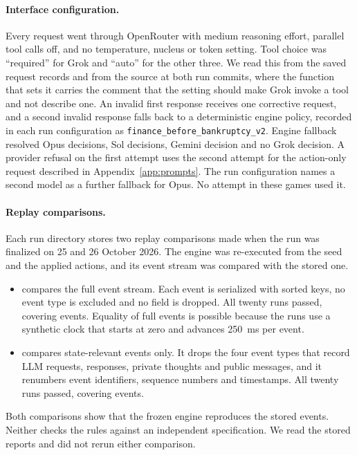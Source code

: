 \paragraph{Interface configuration.}
Every request went through OpenRouter with medium reasoning effort, parallel tool calls off, and no temperature, nucleus or token setting. Tool choice was ``required'' for Grok and ``auto'' for the other three. We read this from the  saved request records and from the source at both run commits, where the function that sets it carries the comment that the setting should make Grok invoke a tool and not describe one. An invalid first response receives one corrective request, and a second invalid response falls back to a deterministic engine policy, recorded in each run configuration as \texttt{finance\_before\_bankruptcy\_v2}. Engine fallback resolved  Opus decisions,  Sol decisions,  Gemini decision and no Grok decision. A provider refusal on the first attempt uses the second attempt for the action-only request described in Appendix~\ref{app:prompts}. The run configuration names a second model as a further fallback for Opus. No attempt in these games used it.

\paragraph{Replay comparisons.}
Each run directory stores two replay comparisons made when the run was finalized on 25 and 26 October 2026. The engine was re-executed from the seed and the applied actions, and its event stream was compared with the stored one.
\begin{itemize}
\item {} compares the full event stream. Each event is serialized with sorted keys, no event type is excluded and no field is dropped. All twenty runs passed, covering  events. Equality of full events is possible because the runs use a synthetic clock that starts at zero and advances 250~ms per event.
\item {} compares state-relevant events only. It drops the four event types that record LLM requests, responses, private thoughts and public messages, and it renumbers event identifiers, sequence numbers and timestamps. All twenty runs passed, covering  events.
\end{itemize}
Both comparisons show that the frozen engine reproduces the stored events. Neither checks the rules against an independent specification. We read the stored reports and did not rerun either comparison.

